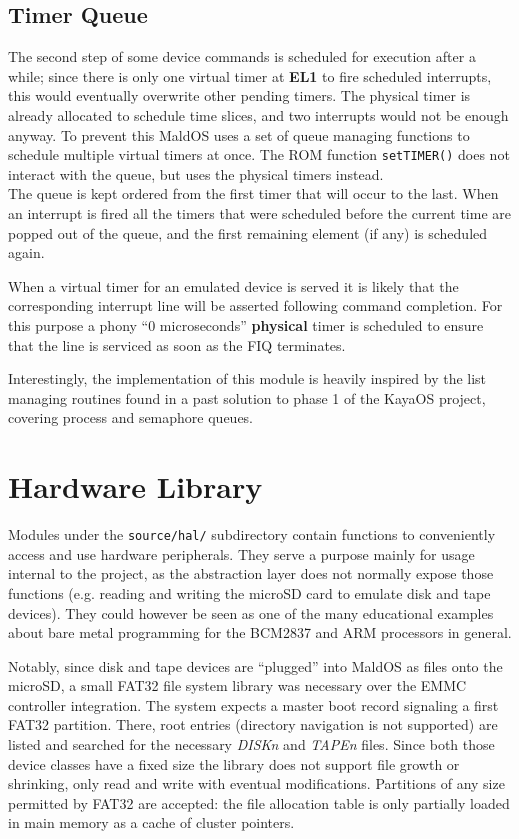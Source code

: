 \documentclass[12pt,a4paper,openright,twoside]{report}
\begin{document}
\subsection{Timer Queue}
The second step of some device commands is scheduled for execution after a while;
since there is only one virtual timer at \textbf{EL1} to fire scheduled interrupts, this would
eventually overwrite other pending timers. The physical timer is already allocated
to schedule time slices, and two interrupts would not be enough anyway.
To prevent this MaldOS uses a set of queue managing functions to 
schedule multiple virtual timers at once. 
The ROM function {\tt setTIMER()} does not interact with the queue, but uses
the physical timers instead.\\
The queue is kept ordered from the first timer that will occur to the last.
When an interrupt is fired all the timers that were scheduled before the
current time are popped out of the queue, and the first remaining element (if any)
is scheduled again.

When a virtual timer for an emulated device is served it is likely that the
corresponding interrupt line will be asserted following command completion. 
For this purpose a phony ``0 microseconds'' \textbf{physical} timer is scheduled to 
ensure that the line is serviced as soon as the FIQ terminates.

Interestingly, the implementation of this module is heavily inspired by the list
managing routines found in a past solution to phase 1 of the KayaOS project, 
covering process and semaphore queues.

\section{Hardware Library}
Modules under the {\tt source/hal/} subdirectory contain functions to conveniently access 
and use hardware peripherals. They serve a purpose mainly for usage internal to 
the project, as the abstraction layer does not normally expose those functions
(e.g. reading and writing the microSD card to emulate disk and tape devices).
They could however be seen as one of the many educational examples about 
bare metal programming for the BCM2837 and ARM processors in general.

Notably, since disk and tape devices are ``plugged'' into MaldOS as files onto
the microSD, a small FAT32 file system library was necessary over the EMMC controller
integration.
The system expects a master boot record signaling a first FAT32 partition. There,
root entries (directory navigation is not supported) are listed and searched for
the necessary \textit{DISKn} and \textit{TAPEn} files. Since both those device
classes have a fixed size the library does not support file growth or shrinking,
only read and write with eventual modifications.
Partitions of any size permitted by FAT32 are accepted: the file allocation table
is only partially loaded in main memory as a cache of cluster pointers.
\end{document}
